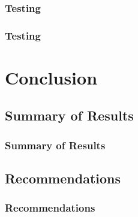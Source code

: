 \documentclass{beamer}
\begin{document}
\subsubsection{Testing}
\begin{frame}
\frametitle{Testing}
\end{frame}

\section{Conclusion}
\subsection{Summary of Results}
\begin{frame}
\frametitle{Summary of Results}
\end{frame}

\subsection{Recommendations}
\begin{frame}
\frametitle{Recommendations}
\end{frame}
\end{document}
